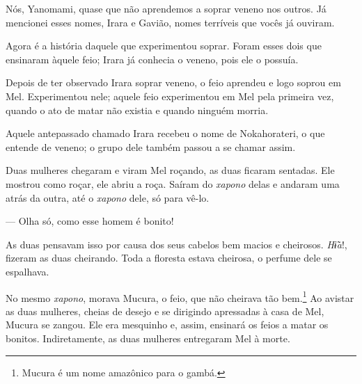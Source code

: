 Nós, Yanomami, quase que não aprendemos a soprar veneno nos outros. Já
mencionei esses nomes, Irara e Gavião, nomes terríveis que vocês já
ouviram. 

Agora é a história daquele que experimentou soprar. Foram esses dois que
ensinaram àquele feio; Irara já conhecia o veneno, pois ele o possuía. 

Depois de ter observado Irara soprar veneno, o feio aprendeu e logo
soprou em Mel. Experimentou nele; aquele feio experimentou em Mel pela
primeira vez, quando o ato de matar não existia e quando ninguém
morria. 

Aquele antepassado chamado Irara recebeu o nome de Nokahorateri, o que
entende de veneno; o grupo dele também passou a se chamar assim. 



Duas mulheres chegaram e viram Mel roçando, as duas ficaram sentadas. Ele
mostrou como roçar, ele abriu a roça. Saíram do \textit{xapono} delas e andaram uma
atrás da outra, até o \textit{xapono} dele, só para vê-lo. 

--- Olha só, como esse homem é bonito! 

As duas pensavam isso por causa dos seus cabelos bem macios e
cheirosos. \textit{Hɨ̃a}!, fizeram as duas cheirando. Toda a floresta
estava cheirosa, o perfume dele se espalhava. 

No mesmo \textit{xapono}, morava Mucura, o feio, que não cheirava tão bem.\footnote{Mucura é um nome amazônico para o gambá.} Ao avistar as duas mulheres, cheias de desejo e se
dirigindo apressadas à casa de Mel, Mucura se zangou. Ele era mesquinho
e, assim, ensinará os feios a matar os bonitos. Indiretamente, as
duas mulheres entregaram Mel à morte. 


